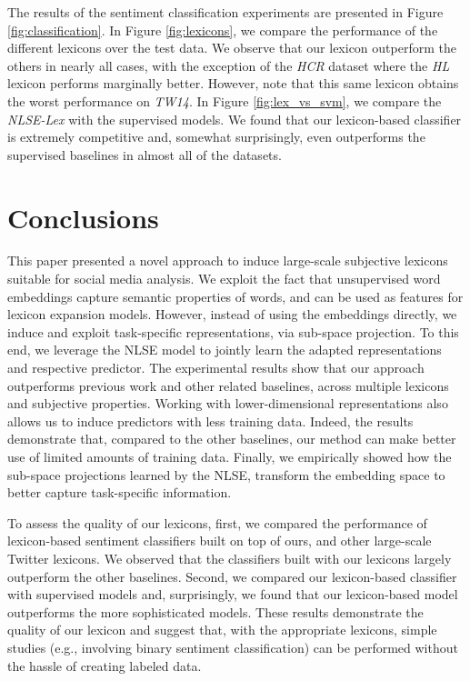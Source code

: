 \documentclass[letterpaper]{article}
\newcommand{\newcite}[1]{\citeauthor{#1} \shortcite{#1}}
\begin{document}
The results of the sentiment classification experiments are presented in Figure \ref{fig:classification}. In Figure \ref{fig:lexicons}, we compare the performance of the different lexicons over the test data. We observe that our lexicon outperform the others in nearly all cases, with the exception of the \textsl{HCR} dataset where the \textsl{HL} lexicon performs marginally better. However, note that this same lexicon obtains the worst performance on \textsl{TW14}. In Figure \ref{fig:lex_vs_svm}, we compare the \textsl{NLSE-Lex} with the supervised models. We found that our lexicon-based classifier is extremely competitive and, somewhat surprisingly, even outperforms the supervised baselines in almost all of the datasets. 


\section{Conclusions}

This paper presented a novel approach to induce large-scale subjective lexicons suitable for social media analysis. We exploit the fact that unsupervised word embeddings capture semantic properties of words, and can be used as features for lexicon expansion models. However, instead of using the embeddings directly, we induce and exploit task-specific representations, via sub-space projection. To this end, we leverage the \newcite{astudillo-EtAl:2015:ACL-IJCNLP} NLSE model to jointly learn the adapted representations and respective predictor. The experimental results show that our approach outperforms previous work and other related baselines, across multiple lexicons and subjective properties. Working with lower-dimensional representations also allows us to induce predictors with less training data. Indeed, the results demonstrate that, compared to the other baselines, our method can make better use of limited amounts of training data. Finally, we empirically showed how the sub-space projections learned by the NLSE, transform the embedding space to better capture task-specific information.

To assess the quality of our lexicons, first, we compared the performance of lexicon-based sentiment classifiers built on top of ours, and other large-scale Twitter lexicons. We observed that the classifiers built with our lexicons largely outperform the other baselines. Second, we compared our lexicon-based classifier with supervised models and, surprisingly, we found that our lexicon-based model outperforms the more sophisticated models. These results demonstrate the quality of our lexicon and suggest that, with the appropriate lexicons, simple studies (e.g., involving binary sentiment classification) can be performed without the hassle of creating labeled data.



\end{document}
